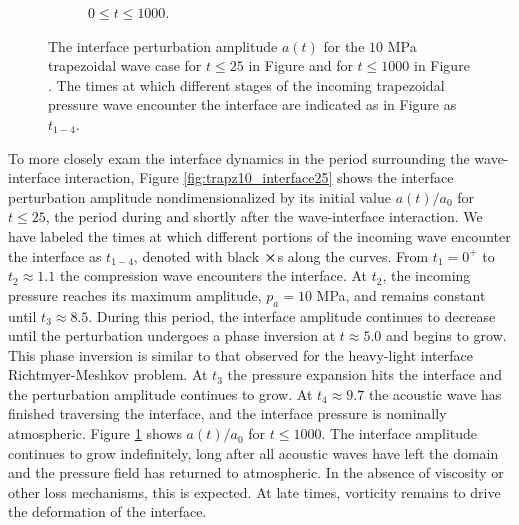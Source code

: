 \begin{figure}[h]
\begin{subfigure}[b]{0.45\textwidth}
    \caption{\label{fig:trapz10_interface1000} $0\leq t \leq 1000$.}
  \end{subfigure}
  \caption[The interface perturbation amplitude history for 10 MPa
  trapezoidal wave]{The interface perturbation amplitude $a(t)$ for
    the $10$ MPa trapezoidal wave case for $t\leq25$ in Figure \protect{} and for
    $t\leq1000$ in Figure \protect{}. The times at which different stages of the
    incoming trapezoidal pressure wave encounter the interface are
    indicated as in Figure \protect{} as $t_{1-4}$.}
  \label{fig:trapz10_interface}
\end{figure}\par
% 
To more closely exam the interface dynamics in the period surrounding
the wave-interface interaction, Figure \ref{fig:trapz10_interface25}
shows the interface perturbation amplitude nondimensionalized by its
initial value $a(t)/a_0$ for $t\leq25$, the period during and shortly
after the wave-interface interaction. We have labeled the times at
which different portions of the incoming wave encounter the interface
as $t_{1-4}$, denoted with black $\boldsymbol{\boldsymbol{\times}}$s along the
curves. From $t_1=0^+$ to $t_2\approx1.1$ the compression wave
encounters the interface. At $t_2$, the incoming pressure reaches its
maximum amplitude, $p_a=10$ MPa, and remains constant until
$t_3\approx8.5$. During this period, the interface amplitude continues
to decrease until the perturbation undergoes a
phase inversion at $t\approx 5.0$ and begins to grow. This phase inversion is similar to
that observed for the heavy-light interface Richtmyer-Meshkov
problem. At $t_3$ the pressure expansion hits the interface and the
perturbation amplitude continues to grow. At $t_4\approx9.7$ the
acoustic wave has finished traversing the interface, and the interface
pressure is nominally atmospheric. Figure
\ref{fig:trapz10_interface1000} shows $a(t)/a_0$ for $t\leq1000$. The
interface amplitude continues to grow indefinitely, long after all
acoustic waves have left the domain and the pressure field has
returned to atmospheric. In the absence of viscosity or other loss
mechanisms, this is expected. At late times, vorticity remains to
drive the deformation of the interface.
% 
% 

